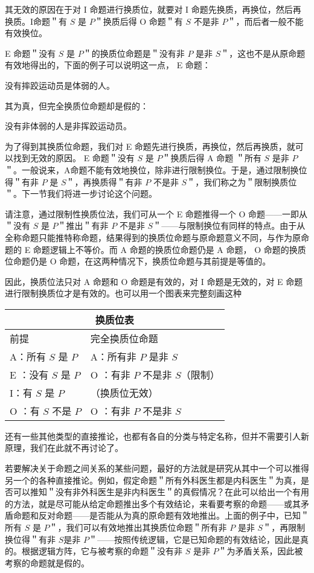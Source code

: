 其无效的原因在于对 I 命题进行换质位，就要对 I 命题先换质，再换位，然后再换质。I命题＂有 $S$ 是 $P$＂换质后得 O 命题＂有 $S$ 不是非 $P$＂，而后者一般不能有效换位。

E 命题＂没有 $S$ 是 $P$＂的换质位命题是＂没有非 $P$ 是非 $S$＂，这也不是从原命题有效地得出的，下面的例子可以说明这一点， E 命题：

没有摔跤运动员是体弱的人。

其为真，但完全换质位命题却是假的：

没有非体弱的人是非挥跤运动员。

为了得到其换质位命题，我们对 E 命题先进行换质，再换位，然后再换质，就可以找到无效的原因。 E 命题＂没有 $S$ 是 $P$＂换质后得 A 命题 ＂所有 $S$ 是非 $P$＂。一般说来，A命题不能有效地换位，除非进行限制换位。于是，通过限制换位得＂有非 $P$ 是 $S$＂，再换质得＂有非 $P$ 不是非 $S$＂，我们称之为＂限制换质位＂。下一节我们将进一步讨论这个问题。

请注意，通过限制性换质位法，我们可从一个 E 命题推得一个 O 命题——一即从＂没有 $S$ 是 $P$＂推出＂有非 $P$ 不是非 $S$＂——与限制换位有同样的特点。由于从全称命题只能推特称命题，结果得到的换质位命题与原命题意义不同，与作为原命题的 E 命题逻辑上不等价。而 A 命题的换质位命题仍是 A 命题， O 命题的换质位命题仍是 O 命题，在这两种情况下，换质位命题与其前提是等值的。

因此，换质位法只对 A 命题和 O 命题是有效的，对 I 命题是无效的，对 E 命题进行限制换质位才是有效的。也可以用一个图表来完整刻画这种

\begin{center}
\begin{tabular}{|l|l|}
\hline
\multicolumn{2}{|c|}{换质位表} \\
\hline
前提 & 完全换质位命题 \\
\hline
A：所有 $S$ 是 $P$ & A：所有非 $P$ 是非 $S$ \\
\hline
E ：没有 $S$ 是 $P$ & O ：有非 $P$ 不是非 $S$（限制） \\
\hline
I：有 $S$ 是 $P$ & （换质位无效） \\
\hline
O ：有 $S$ 不是 $P$ & O ：有非 $P$ 不是非 $S$ \\
\hline
\end{tabular}
\end{center}

还有一些其他类型的直接推论，也都有各自的分类与特定名称，但并不需要引人新原理，我们在此就不再讨论了。

若要解决关于命题之间关系的某些问题，最好的方法就是研究从其中一个可以推得另一个的各种直接推论。例如，假定命题＂所有外科医生都是内科医生＂为真，是否可以推知＂没有非外科医生是非内科医生＂的真假情况？在此可以给出一个有用的方法，就是尽可能从给定命题推出多个有效结论，来看要考察的命题——或其矛盾命题和反对命题——是否能从为真的原命题有效地推出。上面的例子中，已知＂所有 $S$ 是 $P$＂，我们可以有效地推出其换质位命题＂所有非 $P$ 是非 $S$＂，再限制换位得＂有非 $S$是非 $P$＂——按照传统逻辑，它是已知命题的有效结论，因此是真的。根据逻辑方阵，它与被考察的命题＂没有非 $S$ 是非 $P$＂为矛盾关系，因此被考察的命题就是假的。

